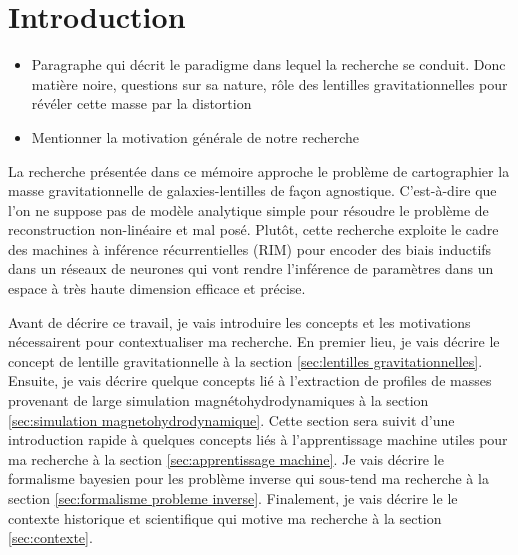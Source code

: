 \chapter{Introduction}
\thispagestyle{empty}

\begin{itemize}
        \item Paragraphe qui décrit le paradigme dans lequel la recherche se conduit. 
                Donc matière noire, questions sur sa nature, rôle des 
                lentilles gravitationnelles pour révéler cette masse par la distortion
        \item Mentionner la motivation générale de notre recherche
\end{itemize}

La recherche présentée dans ce mémoire approche le problème de cartographier la 
masse gravitationnelle de galaxies-lentilles de façon agnostique. C'est-à-dire que 
l'on ne suppose pas de modèle analytique simple pour résoudre le problème 
de reconstruction non-linéaire et mal posé. Plutôt, cette recherche exploite 
le cadre des machines à inférence récurrentielles (RIM) pour encoder des biais 
inductifs dans un réseaux de neurones qui vont rendre l'inférence de 
paramètres dans un espace à très haute dimension efficace et précise.

Avant de décrire ce travail, je vais introduire les concepts 
et les motivations nécessairent pour contextualiser ma recherche.
En premier lieu, je vais décrire le concept de lentille 
gravitationnelle à la section \ref{sec:lentilles gravitationnelles}. Ensuite, 
je vais décrire quelque concepts lié à l'extraction de profiles de masses 
provenant de large simulation magnétohydrodynamiques à la section 
\ref{sec:simulation magnetohydrodynamique}. 
Cette section sera suivit d'une introduction rapide à quelques concepts liés 
à l'apprentissage machine utiles pour ma recherche
à la section \ref{sec:apprentissage machine}. 
Je vais décrire le formalisme bayesien pour les problème inverse 
qui sous-tend ma recherche à la section \ref{sec:formalisme probleme inverse}.
Finalement, je vais décrire le 
le contexte historique et scientifique qui motive ma recherche 
à la section \ref{sec:contexte}.

